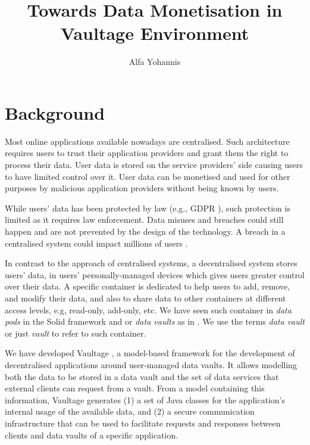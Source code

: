 \documentclass[]{article}
\title{Towards Data Monetisation in Vaultage Environment}
\author{Alfa Yohannis}
\begin{document}
\maketitle

\begin{abstract}
  
\end{abstract}

\section{Background}
Most online applications available nowadays are centralised. Such architecture requires users to trust their application providers and grant them the right to process their data. User data is stored on the service providers' side causing users to have limited control over it. User data can be monetised and used for other purposes by malicious application providers without being known by users.

While users' data has been protected by law (e.g., GDPR \cite{GDPR}), such protection is limited as it requires law enforcement. Data misuses and breaches could still happen and are not prevented by the design of the technology. A breach in a centralised system could impact millions of users 
\cite{cambridgeanalytica,adobebreach,linkedinbreach,yahoobreach}.

In contrast to the approach of centralised systems, a decentralised system stores users' data, in users' personally-managed devices which gives users greater control over their data. A specific container is dedicated to help users to add, remove, and modify their data, and also to share data to other containers at different access levels, e.g, read-only, add-only, etc. We have seen such container in \textit{data pods} in the Solid framework \cite{solid} and or \textit{data vaults} as in \cite{mun2010datavault}. We use the terms \textit{data vault} or just \textit{vault} to refer to such container.  

We have developed Vaultage \cite{yohannis2019towards}, a model-based framework for the development of decentralised applications around user-managed data vaults.
It allows modelling both the data to be stored in a data vault and the set of data services that external clients can request from a vault.
From a model containing this information, Vaultage generates (1) a set of Java classes for the application's internal usage of the available data, and (2) a secure communication infrastructure that can be used to facilitate requests and responses between clients and data vaults of a specific application. 
\end{document}
